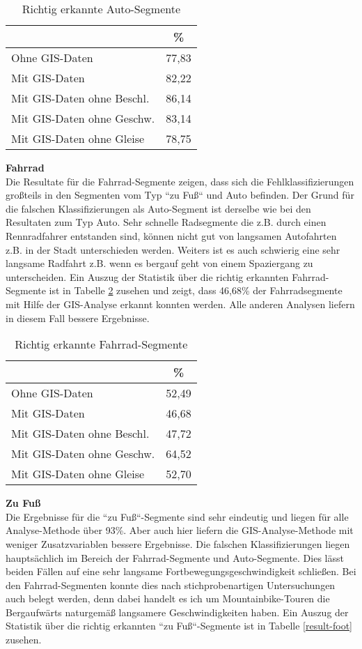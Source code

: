 \begin{table}[h]
\centering
\begin{tabular}{|l|c|}
\hline
 & \% \\ \hline
Ohne GIS-Daten & 77,83 \\ \hline
Mit GIS-Daten & 82,22 \\ \hline
Mit GIS-Daten ohne Beschl. & 86,14 \\ \hline
Mit GIS-Daten ohne Geschw. & 83,14 \\ \hline
Mit GIS-Daten ohne Gleise & 78,75 \\ \hline
\end{tabular}
\caption{Richtig erkannte Auto-Segmente}
\label{result-drive}
\end{table}

\textbf{Fahrrad} \\
Die Resultate für die Fahrrad-Segmente zeigen, dass sich die Fehlklassifizierungen großteils in den Segmenten vom Typ ``zu Fuß`` und Auto befinden. Der Grund für die falschen Klassifizierungen als Auto-Segment ist derselbe wie bei den Resultaten zum Typ Auto. Sehr schnelle Radsegmente die z.B. durch einen Rennradfahrer entstanden sind, können nicht gut von langsamen Autofahrten z.B. in der Stadt unterschieden werden. Weiters ist es auch schwierig eine sehr langsame Radfahrt z.B. wenn es bergauf geht von einem Spaziergang zu unterscheiden. Ein Auszug der Statistik über die richtig erkannten Fahrrad-Segmente ist in Tabelle \ref{result-bike} zusehen und zeigt, dass 46,68\% der Fahrradsegmente mit Hilfe der GIS-Analyse erkannt konnten werden. Alle anderen Analysen liefern in diesem Fall bessere Ergebnisse.

\begin{table}[h]
\centering
\begin{tabular}{|l|c|}
\hline
 & \% \\ \hline
Ohne GIS-Daten & 52,49 \\ \hline
Mit GIS-Daten & 46,68 \\ \hline
Mit GIS-Daten ohne Beschl. & 47,72 \\ \hline
Mit GIS-Daten ohne Geschw. & 64,52 \\ \hline
Mit GIS-Daten ohne Gleise & 52,70 \\ \hline
\end{tabular}
\caption{Richtig erkannte Fahrrad-Segmente}
\label{result-bike}
\end{table}

\textbf{Zu Fuß} \\
Die Ergebnisse für die ``zu Fuß``-Segmente sind sehr eindeutig und liegen für alle Analyse-Methode über 93\%.  Aber auch hier liefern die GIS-Analyse-Methode mit weniger Zusatzvariablen bessere Ergebnisse. Die falschen Klassifizierungen liegen hauptsächlich im Bereich der Fahrrad-Segmente und Auto-Segmente. Dies lässt beiden Fällen auf eine sehr langsame Fortbewegungsgeschwindigkeit schließen. Bei den Fahrrad-Segmenten konnte dies nach stichprobenartigen Untersuchungen auch belegt werden, denn dabei handelt es ich um Mountainbike-Touren die Bergaufwärts naturgemäß langsamere Geschwindigkeiten haben. Ein Auszug der Statistik über die richtig erkannten ``zu Fuß``-Segmente ist in Tabelle \ref{result-foot} zusehen.

